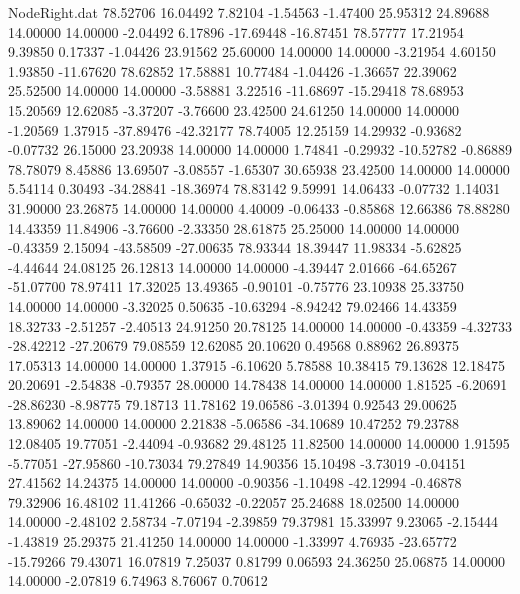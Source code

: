 \begin{filecontents}{NodeRight.dat}
  78.52706   16.04492    7.82104    -1.54563   -1.47400   25.95312   24.89688   14.00000   14.00000   -2.04492    6.17896  -17.69448  -16.87451
  78.57777   17.21954    9.39850     0.17337   -1.04426   23.91562   25.60000   14.00000   14.00000   -3.21954    4.60150    1.93850  -11.67620
  78.62852   17.58881   10.77484    -1.04426   -1.36657   22.39062   25.52500   14.00000   14.00000   -3.58881    3.22516  -11.68697  -15.29418
  78.68953   15.20569   12.62085    -3.37207   -3.76600   23.42500   24.61250   14.00000   14.00000   -1.20569    1.37915  -37.89476  -42.32177
  78.74005   12.25159   14.29932    -0.93682   -0.07732   26.15000   23.20938   14.00000   14.00000    1.74841   -0.29932  -10.52782   -0.86889
  78.78079    8.45886   13.69507    -3.08557   -1.65307   30.65938   23.42500   14.00000   14.00000    5.54114    0.30493  -34.28841  -18.36974
  78.83142    9.59991   14.06433    -0.07732    1.14031   31.90000   23.26875   14.00000   14.00000    4.40009   -0.06433   -0.85868   12.66386
  78.88280   14.43359   11.84906    -3.76600   -2.33350   28.61875   25.25000   14.00000   14.00000   -0.43359    2.15094  -43.58509  -27.00635
  78.93344   18.39447   11.98334    -5.62825   -4.44644   24.08125   26.12813   14.00000   14.00000   -4.39447    2.01666  -64.65267  -51.07700
  78.97411   17.32025   13.49365    -0.90101   -0.75776   23.10938   25.33750   14.00000   14.00000   -3.32025    0.50635  -10.63294   -8.94242
  79.02466   14.43359   18.32733    -2.51257   -2.40513   24.91250   20.78125   14.00000   14.00000   -0.43359   -4.32733  -28.42212  -27.20679
  79.08559   12.62085   20.10620     0.49568    0.88962   26.89375   17.05313   14.00000   14.00000    1.37915   -6.10620    5.78588   10.38415
  79.13628   12.18475   20.20691    -2.54838   -0.79357   28.00000   14.78438   14.00000   14.00000    1.81525   -6.20691  -28.86230   -8.98775
  79.18713   11.78162   19.06586    -3.01394    0.92543   29.00625   13.89062   14.00000   14.00000    2.21838   -5.06586  -34.10689   10.47252
  79.23788   12.08405   19.77051    -2.44094   -0.93682   29.48125   11.82500   14.00000   14.00000    1.91595   -5.77051  -27.95860  -10.73034
  79.27849   14.90356   15.10498    -3.73019   -0.04151   27.41562   14.24375   14.00000   14.00000   -0.90356   -1.10498  -42.12994   -0.46878
  79.32906   16.48102   11.41266    -0.65032   -0.22057   25.24688   18.02500   14.00000   14.00000   -2.48102    2.58734   -7.07194   -2.39859
  79.37981   15.33997    9.23065    -2.15444   -1.43819   25.29375   21.41250   14.00000   14.00000   -1.33997    4.76935  -23.65772  -15.79266
  79.43071   16.07819    7.25037     0.81799    0.06593   24.36250   25.06875   14.00000   14.00000   -2.07819    6.74963    8.76067    0.70612

\end{filecontents}
